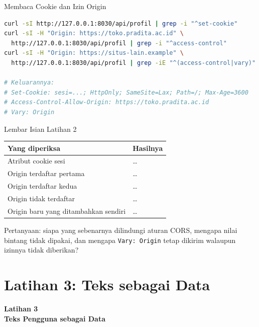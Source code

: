 \documentclass[aspectratio=169, table, 12pt]{beamer}
\begin{document}
\begin{frame}[fragile]{{\Large Membaca Cookie dan Izin Origin}}
  \vspace{2pt}
\begin{lstlisting}[language=bash]
curl -sI http://127.0.0.1:8030/api/profil | grep -i "^set-cookie"
curl -sI -H "Origin: https://toko.pradita.ac.id" \
  http://127.0.0.1:8030/api/profil | grep -i "^access-control"
curl -sI -H "Origin: https://situs-lain.example" \
  http://127.0.0.1:8030/api/profil | grep -iE "^(access-control|vary)"

# Keluarannya:
# Set-Cookie: sesi=...; HttpOnly; SameSite=Lax; Path=/; Max-Age=3600
# Access-Control-Allow-Origin: https://toko.pradita.ac.id
# Vary: Origin
\end{lstlisting}
\end{frame}

\begin{frame}{{\Large Lembar Isian Latihan 2}}
  \vspace{6pt}
  \centering
  {\footnotesize
  \begin{tabularx}{\textwidth}{lY}
    \hline
    \textbf{Yang diperiksa} & \textbf{Hasilnya} \\
    \hline
    Atribut cookie sesi & \dots \\
    \hline
    Origin terdaftar pertama & \dots \\
    \hline
    Origin terdaftar kedua & \dots \\
    \hline
    Origin tidak terdaftar & \dots \\
    \hline
    Origin baru yang ditambahkan sendiri & \dots \\
    \hline
  \end{tabularx}}

  \vspace{6pt}
  {\footnotesize Pertanyaan: siapa yang sebenarnya dilindungi aturan CORS,
  mengapa nilai bintang tidak dipakai, dan mengapa \texttt{Vary: Origin}
  tetap dikirim walaupun izinnya tidak diberikan?}
\end{frame}

\section{Latihan 3: Teks sebagai Data}

\begin{frame}{\hfill}
  \centering
  \Huge{\textbf{Latihan 3\\Teks Pengguna sebagai Data}}
\end{frame}
\end{document}
